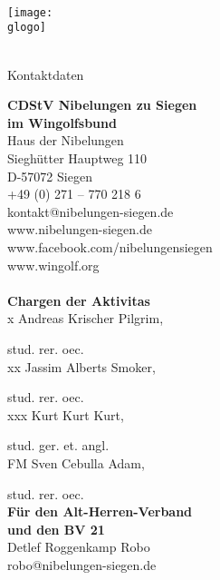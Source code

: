\newcommand \gvierteSeiteTitel {Kontaktdaten}

\newcommand \gvierteSeite {
	\textbf{CDStV Nibelungen zu Siegen\\im Wingolfsbund}\\
	Haus der Nibelungen\\
	Sieghütter Hauptweg 110\\
	D-57072 Siegen \\
	+49 (0) 271 -- 770 218 6\\
	kontakt@nibelungen-siegen.de\\
	www.nibelungen-siegen.de\\
	www.facebook.com/nibelungensiegen\\
	www.wingolf.org\\
	\\
	\textbf{Chargen der Aktivitas}\\
	\setlength\parindent{24pt}
	x	Andreas Krischer \vulgo Pilgrim,
	\par stud. rer. oec.\\
	xx	Jassim Alberts \vulgo Smoker,
	\par stud. rer. oec.\\
	xxx	Kurt Kurt \vulgo Kurt,
	\par stud. ger. et. angl.\\
	FM	Sven Cebulla \vulgo Adam,
	\par stud. rer. oec.
	\setlength\parindent{0pt}
	\\
	\textbf{Für den Alt-Herren-Verband\\und den BV 21}\\
	Detlef Roggenkamp \vulgo Robo\\
	robo@nibelungen-siegen.de\\
} 




\newcommand \lersteSeite {
		
		\gorga \\
		{\fontsize {\gsgL}{\dls} \selectfont \gorgb} \\
		\gorgc \\	
		\texttt{[image: \\glogo]}
		{\fontsize {\gsgL}{\dls} \selectfont \gsempro} \\
		\gsem \\
}

\neueSeite
	{\ohneKopzeile}
	{\zentriert}
	{\ohneTitel}
	{\lersteSeite}	


\neueSeite
	{\mitKopfzeile}
	{\linksbuending}
	{\gzweiteSeiteTitel}
	{\gzweiteSeite}
	

\neueSeite
	{\mitKopfzeile}
	{\linksbuending}
	{\gdritteSeiteTitel}
	{\gdritteSeite}
	

\neueSeite
	{\mitKopfzeile}
	{\linksbuending}
	{\gvierteSeiteTitel}
	{\gvierteSeite}
